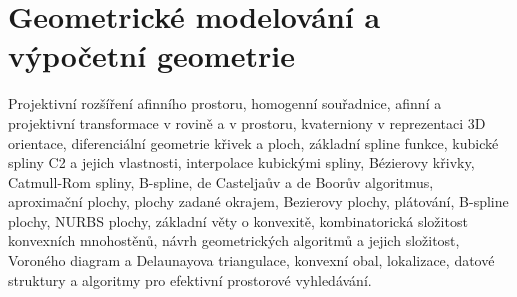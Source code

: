 \newpage
\section{Geometrické modelování a výpočetní geometrie}
\begin{pozadavky}
\begin{pitemize}
\item Projektivní rozšíření afinního prostoru, homogenní souřadnice, afinní a projektivní transformace v rovině a v prostoru, kvaterniony v reprezentaci 3D orientace, diferenciální geometrie křivek a ploch, základní spline funkce, kubické spliny C2 a jejich vlastnosti, interpolace kubickými spliny, Bézierovy křivky, Catmull-Rom spliny, B-spline, de Casteljaův a de Boorův algoritmus, aproximační plochy, plochy zadané okrajem, Bezierovy plochy, plátování, B-spline plochy, NURBS plochy, základní věty o konvexitě, kombinatorická složitost konvexních mnohostěnů, návrh geometrických algoritmů a jejich složitost, Voroného diagram a Delaunayova triangulace, konvexní obal, lokalizace, datové struktury a algoritmy pro efektivní prostorové vyhledávání.
\end{pitemize}
\end{pozadavky}